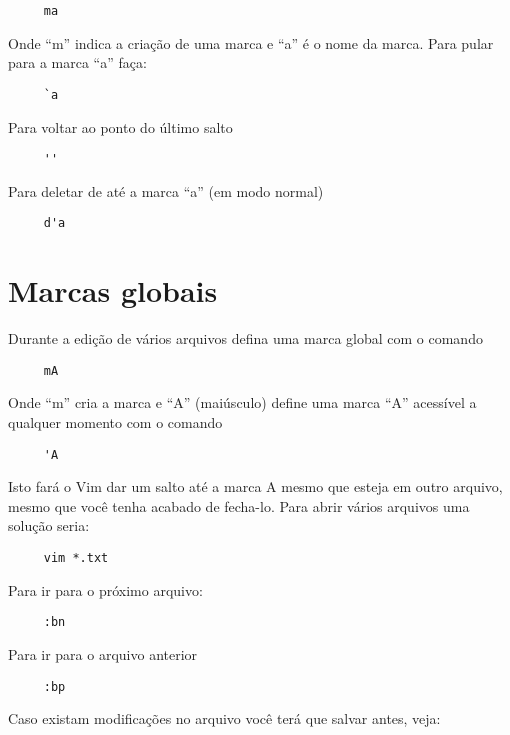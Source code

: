 \begin{verbatim}
     ma
\end{verbatim}

Onde ``m'' indica a criação de uma marca e ``a'' é o nome da marca. Para pular para a marca ``a'' faça:

\begin{verbatim}
     `a
\end{verbatim}

Para voltar ao ponto do último salto

\begin{verbatim}
     ''
\end{verbatim}

Para deletar de até a marca ``a'' (em modo normal)

\begin{verbatim}
     d'a
\end{verbatim}

\section{Marcas globais}
Durante a edição de vários arquivos defina uma marca global com o comando

\begin{verbatim}
     mA
\end{verbatim}

Onde ``m'' cria a marca e ``A'' (maiúsculo) define uma marca ``A'' acessível a qualquer momento com o comando

\begin{verbatim}
     'A
\end{verbatim}

Isto fará o Vim dar um salto até a marca A mesmo que esteja em outro
arquivo, mesmo que você tenha acabado de fecha-lo. Para abrir vários
arquivos uma solução seria:

\begin{verbatim}
     vim *.txt
\end{verbatim}

Para ir para o próximo arquivo:

\begin{verbatim}
     :bn
\end{verbatim}

Para ir para o arquivo anterior

\begin{verbatim}
     :bp
\end{verbatim}

Caso existam modificações no arquivo você terá que salvar antes, veja:

